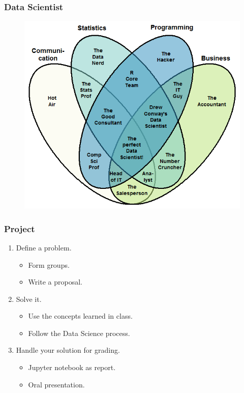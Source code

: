 \documentclass{beamer}
\begin{document}
\begin{frame}
	\frametitle{Data Scientist}
	\begin{figure}
		\includegraphics[height=0.8\textheight]{data_scientist}
	\end{figure}
\end{frame}


\begin{frame}
	\frametitle{Project}
	\begin{enumerate}
		\item Define a problem.
			\begin{itemize}
				\item Form groups.
				\item Write a proposal.
			\end{itemize}
		\vfill
		\item Solve it.
			\begin{itemize}
				\item Use the concepts learned in class.
				\item Follow the Data Science process.
			\end{itemize}
		\vfill
		\item Handle your solution for grading.
			\begin{itemize}
				\item Jupyter notebook as report.
				\item Oral presentation.
			\end{itemize}
	\end{enumerate}
\end{frame}
\end{document}

